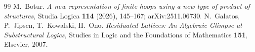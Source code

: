 \documentclass[a4paper]{article} %
\begin{document}
\begin{thebibliography}{99}
M.~Botur.
\newblock \emph{A new representation of finite hoops using a new type of product of structures,}
\newblock Studia Logica \textbf{114} (2026), 145--167; arXiv:2511.06730.
N.~Galatos, P.~Jipsen, T.~Kowalski, H.~Ono.
\newblock \emph{Residuated Lattices: An Algebraic Glimpse at Substructural Logics,}
\newblock Studies in Logic and the Foundations of Mathematics \textbf{151}, Elsevier, 2007.
\end{thebibliography}
\end{document}
